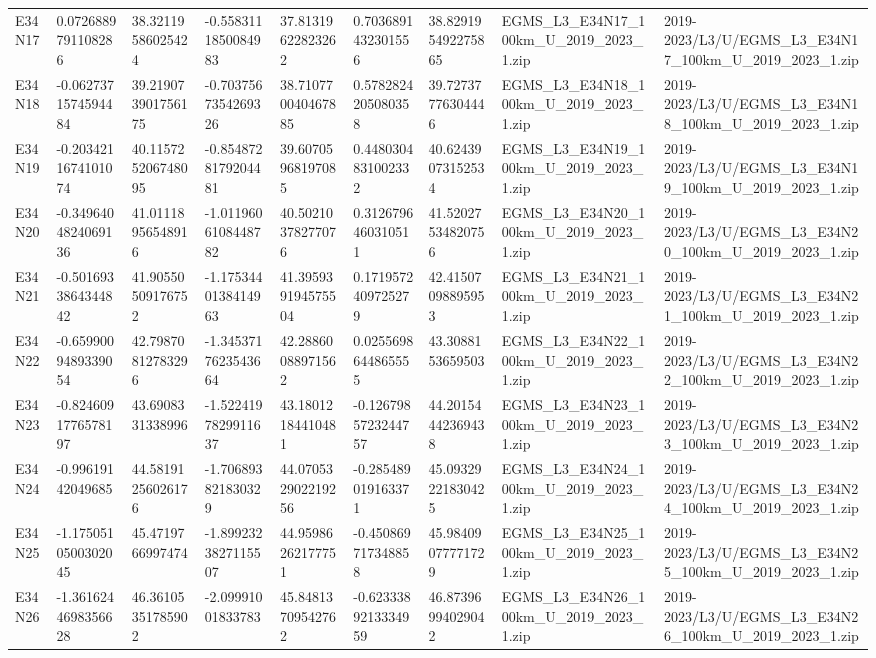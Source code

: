 \begin{landscape}
\begin{longtable}{lllllllll}
E34N17 & 0.0726889791108286 & 38.32119586025424 & -0.5583111850084983 & 37.81319622823262 & 0.7036891432301556 & 38.829195492275865 & EGMS\_L3\_E34N17\_100km\_U\_2019\_2023\_1.zip & 2019-2023/L3/U/EGMS\_L3\_E34N17\_100km\_U\_2019\_2023\_1.zip \\
E34N18 & -0.0627371574594484 & 39.219073901756175 & -0.7037567354269326 & 38.710770040467885 & 0.5782824205080358 & 39.72737776304446 & EGMS\_L3\_E34N18\_100km\_U\_2019\_2023\_1.zip & 2019-2023/L3/U/EGMS\_L3\_E34N18\_100km\_U\_2019\_2023\_1.zip \\
E34N19 & -0.2034211674101074 & 40.115725206748095 & -0.8548728179204481 & 39.60705968197085 & 0.4480304831002332 & 40.62439073152534 & EGMS\_L3\_E34N19\_100km\_U\_2019\_2023\_1.zip & 2019-2023/L3/U/EGMS\_L3\_E34N19\_100km\_U\_2019\_2023\_1.zip \\
E34N20 & -0.3496404824069136 & 41.01118956548916 & -1.0119606108448782 & 40.50210378277076 & 0.3126796460310511 & 41.52027534820756 & EGMS\_L3\_E34N20\_100km\_U\_2019\_2023\_1.zip & 2019-2023/L3/U/EGMS\_L3\_E34N20\_100km\_U\_2019\_2023\_1.zip \\
E34N21 & -0.5016933864344842 & 41.90550509176752 & -1.1753440138414963 & 41.395939194575504 & 0.1719572409725279 & 42.41507098895953 & EGMS\_L3\_E34N21\_100km\_U\_2019\_2023\_1.zip & 2019-2023/L3/U/EGMS\_L3\_E34N21\_100km\_U\_2019\_2023\_1.zip \\
E34N22 & -0.6599009489339054 & 42.79870812783296 & -1.3453717623543664 & 42.28860088971562 & 0.0255698644865555 & 43.3088153659503 & EGMS\_L3\_E34N22\_100km\_U\_2019\_2023\_1.zip & 2019-2023/L3/U/EGMS\_L3\_E34N22\_100km\_U\_2019\_2023\_1.zip \\
E34N23 & -0.8246091776578197 & 43.6908331338996 & -1.5224197829911637 & 43.18012184410481 & -0.1267985723244757 & 44.20154442369438 & EGMS\_L3\_E34N23\_100km\_U\_2019\_2023\_1.zip & 2019-2023/L3/U/EGMS\_L3\_E34N23\_100km\_U\_2019\_2023\_1.zip \\
E34N24 & -0.99619142049685 & 44.58191256026176 & -1.706893821830329 & 44.070532902219256 & -0.285489019163371 & 45.09329221830425 & EGMS\_L3\_E34N24\_100km\_U\_2019\_2023\_1.zip & 2019-2023/L3/U/EGMS\_L3\_E34N24\_100km\_U\_2019\_2023\_1.zip \\
E34N25 & -1.1750510500302045 & 45.4719766997474 & -1.8992323827115507 & 44.95986262177751 & -0.450869717348858 & 45.98409077771729 & EGMS\_L3\_E34N25\_100km\_U\_2019\_2023\_1.zip & 2019-2023/L3/U/EGMS\_L3\_E34N25\_100km\_U\_2019\_2023\_1.zip \\
E34N26 & -1.3616244698356628 & 46.36105351785902 & -2.09991001833783 & 45.84813709542762 & -0.6233389213334959 & 46.87396994029042 & EGMS\_L3\_E34N26\_100km\_U\_2019\_2023\_1.zip & 2019-2023/L3/U/EGMS\_L3\_E34N26\_100km\_U\_2019\_2023\_1.zip \\

\end{longtable}
\end{landscape}
